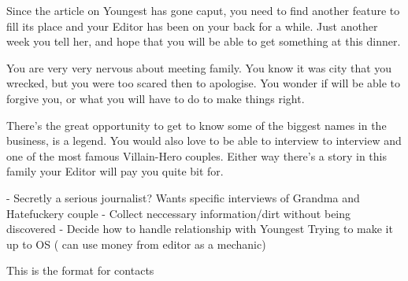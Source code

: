 \documentclass[char]{LRSguildcamp1}
\begin{document}
Since the article on Youngest has gone caput, you need to find another feature to fill its place and your Editor has been on your back for a while. Just another week you tell her, and hope that you will be able to get something at this dinner. 

You are very very nervous about meeting \cYoungest{} family. You know it was \cOS{} city that you wrecked, but you were too scared then to apologise. You wonder if \cOS{} will be able to forgive you, or what you will have to do to make things right. 

There’s the great opportunity to get to know some of the biggest names in the business, \cGrandma{} is a legend. You would also love to be able to interview to interview \cOldest{} and \cOS{} one of the most famous Villain-Hero couples. Either way there's a story in this family your Editor will pay you quite bit for. 




\begin{itemz}[Goals]
	\item 
\end{itemz}

\begin{itemz}[Notes]
	\item 
	- Secretly a serious journalist?  Wants specific interviews of Grandma and Hatefuckery couple 
	- Collect neccessary information/dirt without being discovered
	- Decide how to handle relationship with Youngest 
	Trying to make it up to OS ( can use money from editor as a mechanic)
	
\end{itemz}

\begin{contacts}
	\contact{} This is the format for contacts 
\end{contacts}
\end{document}
